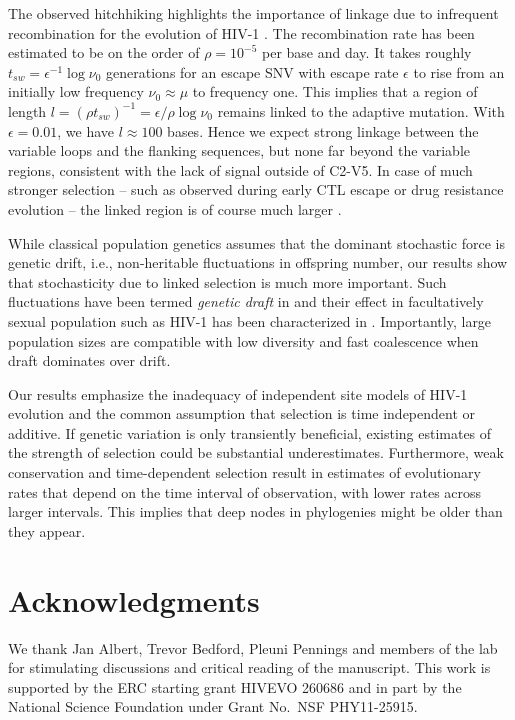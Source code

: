 \documentclass[11pt]{article}
\newcommand{\shankaregion}{C2-V5}
\begin{document}
The observed hitchhiking highlights the importance of linkage due to
infrequent recombination for the evolution of HIV-1
\citep{neher_recombination_2010, batorsky_estimate_2011,
josefsson_majority_2011}. The recombination rate has been estimated to be on the
order of $\rho = 10^{-5}$ per base and day. It takes roughly $t_{sw} =
\epsilon^{-1} \log \nu_0$ generations for an escape SNV with escape rate
$\epsilon$ to rise from an initially low frequency $\nu_0\approx \mu$ to frequency
one. This implies that a region of length $l = (\rho t_{sw})^{-1} = \epsilon /
\rho \log \nu_0$ remains linked to the adaptive mutation. With $\epsilon=0.01$,
we have $l\approx 100$ bases. Hence we expect strong linkage between the
variable loops and the flanking sequences, but none far beyond the variable
regions, consistent with the lack of signal outside of \shankaregion. In case of
much stronger selection -- such as observed during early CTL escape or drug
resistance evolution -- the linked region is of course much larger
\citep{nijhuis_stochastic_1998}. 

While classical population genetics assumes that the dominant stochastic force
is genetic drift, i.e., non-heritable fluctuations in offspring number, our
results show that stochasticity due to linked selection is much more important.
Such fluctuations have been termed \emph{genetic draft} in
\citet{gillespie_genetic_2000} and their effect in facultatively sexual population
such as HIV-1 has been characterized in \citep{neher_genetic_2011}. Importantly,
large population sizes are compatible with low diversity and fast coalescence
when draft dominates over drift.

Our results emphasize the inadequacy of independent site models of HIV-1 evolution
and the common assumption that selection is time independent or additive. 
If genetic variation is only transiently beneficial, existing estimates of the
strength of selection \citep{neher_recombination_2010,batorsky_estimate_2011}
could be substantial underestimates. Furthermore, weak conservation and
time-dependent selection result in estimates of evolutionary 
rates that depend on the time interval of observation, with lower rates across
larger intervals. This implies that deep nodes in phylogenies might be older than 
they appear.


\section*{Acknowledgments}
We thank Jan Albert, Trevor Bedford, Pleuni Pennings and members of the lab for 
stimulating discussions and critical reading of the manuscript.
This work is supported by the ERC starting grant HIVEVO 260686 and 
in part by the National Science Foundation under Grant No.~NSF PHY11-25915.
\end{document}
